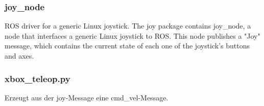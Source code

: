 \begin{comment}
--------------------------------------------------------------------------------
- http://wiki.ros.org/teleop_twist_joy
- http://yardbot.ca/2014/10/writing-custom-joystick-teleop-node-ros/

<node pkg="joy" type="joy_node" name="joy_node" output="screen">
	<param name="dev" type="string" value="/dev/input/js0" />
</node>

Published Topics
- joy (joy/Joy): Outputs the joystick state.
- joy (sensor_msgs/Joy): Outputs the joystick state.

Parameters
~dev (string, default: /dev/input/js0): Linux joystick device from which to read joystick events.
~autorepeat_rate (double, default: 0.0 (disabled)): Rate in Hz at which a joystick that has a non-changing state will resend the previously sent message.

\end{comment}
\subsubsection{joy\_node}


ROS driver for a generic Linux joystick. The joy package contains joy\_node, a node that interfaces a generic Linux joystick to ROS. This node publishes a "Joy" message, which contains the current state of each one of the joystick's buttons and axes.





\begin{comment}
--------------------------------------------------------------------------------
rospy.Subscriber('joy', Joy, callback)

# TurtleSim commands
# http://wiki.ros.org/ROS/Tutorials/UnderstandingTopics
pub = rospy.Publisher('/cmd_vel', Twist, queue_size=60)
\end{comment}
\subsubsection{xbox\_teleop.py}

Erzeugt aus der joy-Message eine cmd\_vel-Message.





\begin{comment}
--------------------------------------------------------------------------------
A ROS driver for the SICK TiM series of laser scanners.
Auslesen des 2D-LiDAR-Sensors und erstellen einer 
TIM571-2050101 (P/N 1075091); frequency: 15 Hz, angular resolution: 0.333°, range: 25m; see sick_tim571_2050101.launch

scan (sensor_msgs/LaserScan): The published laser scans.

~frame_id (str, default: laser): The TF frame in which laser scans will be returned.
\end{comment}
